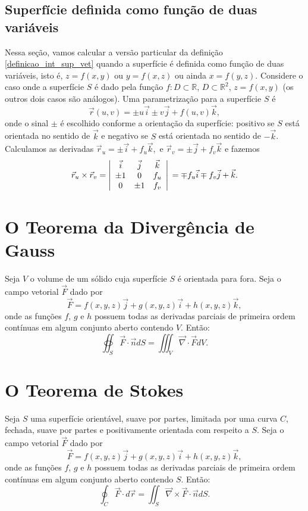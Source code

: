 \subsection{Superfície definida como função de duas variáveis}
Nessa seção, vamos calcular a versão particular da definição \eqref{definicao_int_sup_vet} quando a superfície é definida como função de duas variáveis, isto é, $z=f(x,y)$ ou $y=f(x,z)$ ou ainda $x=f(y,z)$. Considere o caso onde a superfície $S$ é dado pela função $f:D\subset\mathbb{R}$, $D\subset \mathbb{R}^2$, $z=f(x,y)$ (os outros dois casos são análogos). Uma parametrização para a superfície $S$ é
$$
\vec{r}(u,v)=\pm u\vec{i}\pm v\vec{j}+ f(u,v)\vec{k},
$$
onde o sinal $\pm$ é escolhido conforme a orientação da superfície: positivo se $S$ está orientada no sentido de $\vec{k}$ e negativo se $S$ está orientada no sentido de $-\vec{k}$. Calculamos as derivadas $\vec{r}_u=\pm\vec{i}+ f_u\vec{k},$ e $\vec{r}_v=\pm\vec{j}+ f_v\vec{k}$ e fazemos
$$
  \vec{r}_u\times\vec{r}_v=\left|
 \begin{array}{ccc}
 \vec{i} & \vec{j} & \vec{k} \\
 \pm 1 &0 & f_u \\
0 & \pm 1 & f_v
 \end{array}
\right|\\=\mp f_u\vec{i}\mp f_v\vec{j}+\vec{k}.
$$

\section{O Teorema da Divergência de Gauss}
\begin{teo}
Seja $V$ o volume de um sólido cuja superfície $S$ é orientada para fora. Seja o campo vetorial $\vec{F}$ dado por
$$
\vec{F}=f(x,y,z)\vec{j}+g(x,y,z)\vec{i}+h(x,y,z)\vec{k},
$$
onde as funções $f$, $g$ e $h$ possuem todas as derivadas parciais de primeira ordem contínuas em algum conjunto aberto contendo $V$. Então:
$$
\oiint_S \vec{F}\cdot \vec{n} dS=\iiint_V \vec{\nabla}\cdot \vec{F} dV.
$$
\end{teo}



\section{O Teorema de Stokes}

\begin{teo}
Seja $S$ uma superfície orientável, suave por partes, limitada por uma curva $C$, fechada, suave por partes e positivamente orientada com respeito a $S$. Seja o campo vetorial $\vec{F}$ dado por
$$
\vec{F}=f(x,y,z)\vec{j}+g(x,y,z)\vec{i}+h(x,y,z)\vec{k},
$$
onde as funções $f$, $g$ e $h$ possuem todas as derivadas parciais de primeira ordem contínuas em algum conjunto aberto contendo $S$. Então:
$$
\oint_C \vec{F}\cdot d \vec{r}=\iint_S \vec{\nabla}\times \vec{F}\cdot \vec{n} dS.
$$
\end{teo}
